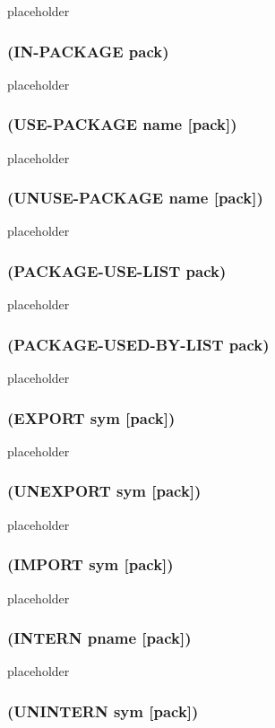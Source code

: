 \documentclass[11pt]{article}
\begin{document}
placeholder
\subsubsection{(IN-PACKAGE pack)}
\label{sec-4-17-6}

placeholder
\subsubsection{(USE-PACKAGE name [pack])}
\label{sec-4-17-7}

placeholder
\subsubsection{(UNUSE-PACKAGE name [pack])}
\label{sec-4-17-8}

placeholder
\subsubsection{(PACKAGE-USE-LIST pack)}
\label{sec-4-17-9}

placeholder
\subsubsection{(PACKAGE-USED-BY-LIST pack)}
\label{sec-4-17-10}

placeholder
\subsubsection{(EXPORT sym [pack])}
\label{sec-4-17-11}

placeholder
\subsubsection{(UNEXPORT sym [pack])}
\label{sec-4-17-12}

placeholder
\subsubsection{(IMPORT sym [pack])}
\label{sec-4-17-13}

placeholder
\subsubsection{(INTERN pname [pack])}
\label{sec-4-17-14}

placeholder
\subsubsection{(UNINTERN sym [pack])}
\label{sec-4-17-15}
\end{document}
